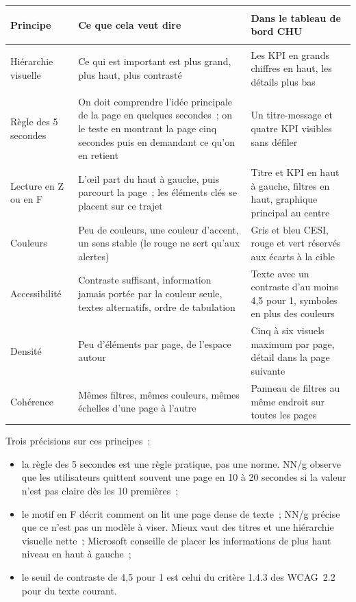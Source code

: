 \begin{center}
\small
\begin{tabularx}{\textwidth}{>{\bfseries\raggedright\arraybackslash}p{3cm} >{\raggedright\arraybackslash}X >{\raggedright\arraybackslash}X}
\toprule
Principe & Ce que cela veut dire & Dans le tableau de bord CHU \\
\midrule
Hiérarchie visuelle & Ce qui est important est plus grand, plus haut, plus contrasté & Les KPI en grands chiffres en haut, les détails plus bas \\
Règle des 5 secondes & On doit comprendre l'idée principale de la page en quelques secondes~; on le teste en montrant la page cinq secondes puis en demandant ce qu'on en retient & Un titre-message et quatre KPI visibles sans défiler \\
Lecture en Z ou en F & L'œil part du haut à gauche, puis parcourt la page~; les éléments clés se placent sur ce trajet & Titre et KPI en haut à gauche, filtres en haut, graphique principal au centre \\
Couleurs & Peu de couleurs, une couleur d'accent, un sens stable (le rouge ne sert qu'aux alertes) & Gris et bleu CESI, rouge et vert réservés aux écarts à la cible \\
Accessibilité & Contraste suffisant, information jamais portée par la couleur seule, textes alternatifs, ordre de tabulation & Texte avec un contraste d'au moins 4,5 pour 1, symboles en plus des couleurs \\
Densité & Peu d'éléments par page, de l'espace autour & Cinq à six visuels maximum par page, détail dans la page suivante \\
Cohérence & Mêmes filtres, mêmes couleurs, mêmes échelles d'une page à l'autre & Panneau de filtres au même endroit sur toutes les pages \\
\bottomrule
\end{tabularx}
\end{center}

\noindent Trois précisions sur ces principes~:
\begin{itemize}
	\item la règle des 5 secondes est une règle pratique, pas une norme. NN/g observe que les utilisateurs quittent souvent une page en 10 à 20 secondes si la valeur n'est pas claire dès les 10 premières~;
	\item le motif en F décrit comment on lit une page dense de texte~; NN/g précise que ce n'est pas un modèle à viser. Mieux vaut des titres et une hiérarchie visuelle nette~; Microsoft conseille de placer les informations de plus haut niveau en haut à gauche~;
	\item le seuil de contraste de 4,5 pour 1 est celui du critère 1.4.3 des WCAG~2.2 pour du texte courant.
\end{itemize}

